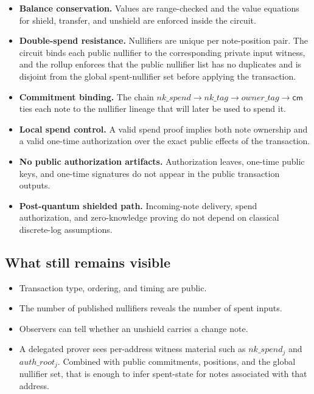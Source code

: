 \documentclass[11pt]{article}
\newcommand{\cm}{\mathsf{cm}}
\begin{document}
\begin{itemize}
  \item \textbf{Balance conservation.} Values are range-checked and the value
        equations for shield, transfer, and unshield are enforced inside the
        circuit.
  \item \textbf{Double-spend resistance.} Nullifiers are unique per
        note-position pair. The circuit binds each public nullifier to the
        corresponding private input witness, and the rollup enforces that the
        public nullifier list has no duplicates and is disjoint from the global
        spent-nullifier set before applying the transaction.
  \item \textbf{Commitment binding.} The chain
        \(nk\_spend \rightarrow nk\_tag \rightarrow owner\_tag \rightarrow \cm\)
        ties each note to the nullifier lineage that will later be used to
        spend it.
  \item \textbf{Local spend control.} A valid spend proof implies both note
        ownership and a valid one-time authorization over the exact public
        effects of the transaction.
  \item \textbf{No public authorization artifacts.} Authorization leaves,
        one-time public keys, and one-time signatures do not appear in the
        public transaction outputs.
  \item \textbf{Post-quantum shielded path.} Incoming-note delivery, spend
        authorization, and zero-knowledge proving do not depend on classical
        discrete-log assumptions.
\end{itemize}

\subsection{What still remains visible}

\begin{itemize}
  \item Transaction type, ordering, and timing are public.
  \item The number of published nullifiers reveals the number of spent inputs.
  \item Observers can tell whether an unshield carries a change note.
  \item A delegated prover sees per-address witness material such as
        \(nk\_spend_j\) and \(auth\_root_j\). Combined with public commitments,
        positions, and the global nullifier set, that is enough to infer
        spent-state for notes associated with that address.
\end{itemize}
\end{document}
